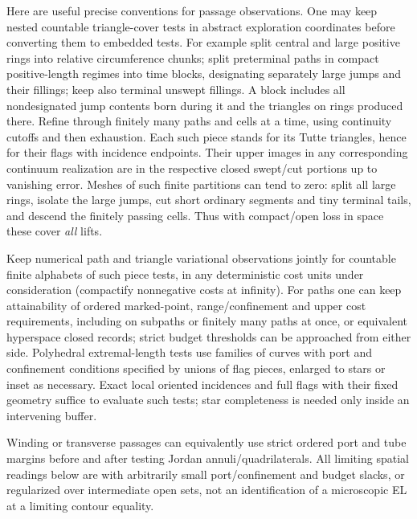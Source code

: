 \begin{definition}\label{kern:buffered-observations}

Here are useful precise conventions for passage observations. One may keep nested countable triangle-cover
tests in abstract exploration coordinates before converting them to embedded tests. For example split
central and large positive rings into relative circumference chunks; split preterminal paths in compact
positive-length regimes into time blocks, designating separately large jumps and their fillings; keep also
terminal unswept fillings. A block includes all nondesignated jump contents born during it and the triangles
on rings produced there. Refine through finitely many paths and cells at a time, using continuity cutoffs
and then exhaustion. Each such piece stands for its Tutte triangles, hence for their flags with incidence
endpoints. Their upper images in any corresponding continuum realization are in the respective closed
swept/cut portions up to vanishing error. Meshes of such finite partitions can tend to zero: split all large
rings, isolate the large jumps, cut short ordinary segments and tiny terminal tails, and descend the
finitely passing cells. Thus with compact/open loss in space these cover \emph{all} lifts.

Keep numerical
path and triangle variational observations jointly for countable finite alphabets of such piece tests, in
any deterministic cost units under consideration (compactify nonnegative costs at infinity). For paths one
can keep attainability of ordered marked-point, range/confinement and upper cost requirements, including on
subpaths or finitely many paths at once, or equivalent hyperspace closed records; strict budget thresholds
can be approached from either side. Polyhedral extremal-length tests use families of curves with port and
confinement conditions specified by unions of flag pieces, enlarged to stars or inset as necessary. Exact
local oriented incidences and full flags with their fixed geometry suffice to evaluate such tests; star
completeness is needed only inside an intervening buffer.

Winding or transverse passages can equivalently
use strict ordered port and tube margins before and after testing Jordan annuli/quadrilaterals. All limiting
spatial readings below are with arbitrarily small port/confinement and budget slacks, or regularized over
intermediate open sets, not an identification of a microscopic EL at a limiting contour equality.

\end{definition}

